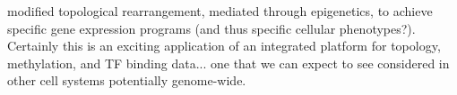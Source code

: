 \documentclass[12pt]{article}
\begin{document}
\begin{addmargin}[6.5mm]{4mm}
modified topological rearrangement, mediated through epigenetics, to achieve specific gene expression programs (and thus specific cellular phenotypes?). Certainly this is an exciting application of an integrated platform for topology, methylation, and TF binding data... one that we can expect to see considered in other cell systems potentially genome-wide. 

\end{addmargin}
\end{document}
